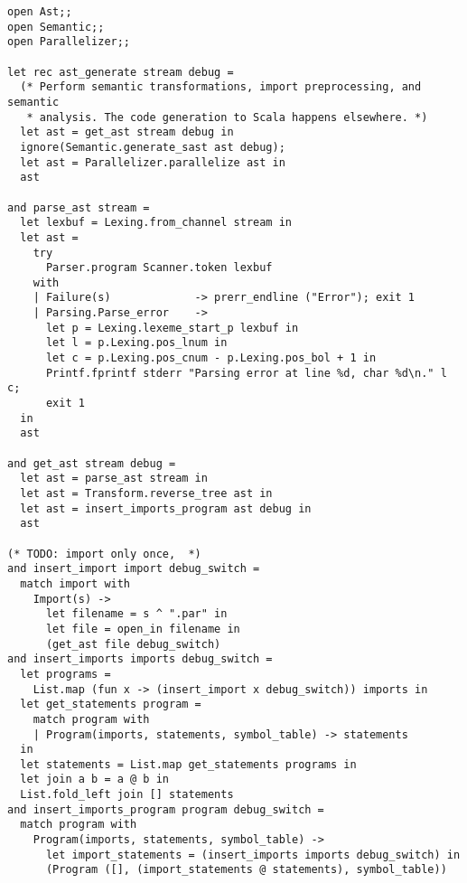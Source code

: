 \begin{verbatim}
open Ast;;
open Semantic;;
open Parallelizer;;

let rec ast_generate stream debug =
  (* Perform semantic transformations, import preprocessing, and semantic
   * analysis. The code generation to Scala happens elsewhere. *)
  let ast = get_ast stream debug in
  ignore(Semantic.generate_sast ast debug);
  let ast = Parallelizer.parallelize ast in
  ast

and parse_ast stream =
  let lexbuf = Lexing.from_channel stream in 
  let ast =
    try
      Parser.program Scanner.token lexbuf
    with
    | Failure(s)             -> prerr_endline ("Error"); exit 1
    | Parsing.Parse_error    ->
      let p = Lexing.lexeme_start_p lexbuf in
      let l = p.Lexing.pos_lnum in
      let c = p.Lexing.pos_cnum - p.Lexing.pos_bol + 1 in
      Printf.fprintf stderr "Parsing error at line %d, char %d\n." l c;
      exit 1
  in
  ast

and get_ast stream debug =
  let ast = parse_ast stream in
  let ast = Transform.reverse_tree ast in
  let ast = insert_imports_program ast debug in  
  ast

(* TODO: import only once,  *)
and insert_import import debug_switch =
  match import with
    Import(s) ->
      let filename = s ^ ".par" in
      let file = open_in filename in
      (get_ast file debug_switch)
and insert_imports imports debug_switch =
  let programs =
    List.map (fun x -> (insert_import x debug_switch)) imports in
  let get_statements program =
    match program with
    | Program(imports, statements, symbol_table) -> statements
  in
  let statements = List.map get_statements programs in
  let join a b = a @ b in
  List.fold_left join [] statements
and insert_imports_program program debug_switch =
  match program with
    Program(imports, statements, symbol_table) ->
      let import_statements = (insert_imports imports debug_switch) in
      (Program ([], (import_statements @ statements), symbol_table))

\end{verbatim}